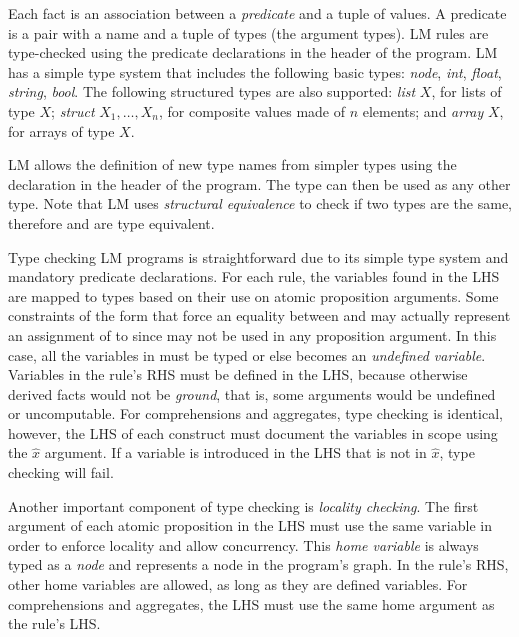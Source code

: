Each fact is an association between a \emph{predicate} and a tuple of values. A
predicate is a pair with a name and a tuple of types (the argument types). LM
rules are type-checked using the predicate declarations in the header of the
program. LM has a simple type system that includes the following basic types:
\emph{node}, \emph{int}, \emph{float}, \emph{string}, \emph{bool}. The following
structured types are also supported: \emph{list} $X$, for lists of type $X$;
\emph{struct} $X_1, \ldots, X_n$, for composite values made of $n$ elements; and
\emph{array} $X$, for arrays of type $X$.

LM allows the definition of new type names from simpler types using the declaration
 in the header of the program. The type
 can then be used as any other type. Note that LM uses
\emph{structural equivalence} to check if two types are the same, therefore
 and  are type equivalent.

Type checking LM programs is straightforward due to its simple type system and
mandatory predicate declarations. For each rule, the variables found in the LHS
are mapped to types based on their use on atomic proposition arguments. Some
constraints of the form  that force an equality between
 and  may actually represent an assignment of
 to  since  may not be used in any proposition
argument. In this case, all the variables in  must be typed or
else  becomes an \emph{undefined variable}. Variables in the rule's RHS
must be defined in the LHS, because otherwise derived facts would not be
\emph{ground}, that is, some arguments would be undefined or uncomputable.  For
comprehensions and aggregates, type checking is identical, however, the LHS of
each construct must document the variables in scope using the $\hat{x}$
argument. If a variable is introduced in the LHS that is not in $\hat{x}$, type
checking will fail.

Another important component of type checking is \emph{locality checking}. The
first argument of each atomic proposition in the LHS must use the same variable
in order to enforce locality and allow concurrency. This \emph{home variable} is
always typed as a \emph{node} and represents a node in the program's graph. In
the rule's RHS, other home variables are allowed, as long as they are defined
variables. For comprehensions and aggregates, the LHS must use the same home
argument as the rule's LHS.

